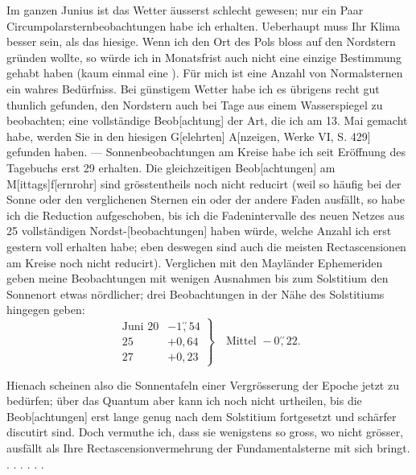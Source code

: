\noindent\hspace*{\parindent}Im ganzen Junius ist das Wetter äusserst schlecht gewesen; nur ein Paar Circumpolarsternbeobachtungen habe ich erhalten. Ueberhaupt muss Ihr Klima  besser sein, als das hiesige. Wenn ich den Ort des Pols bloss auf den Nordstern gründen wollte, so würde ich in Monatsfrist auch nicht eine einzige Bestimmung gehabt haben (kaum einmal eine ). Für mich ist eine Anzahl von Normalsternen ein wahres Bedürfniss. Bei günstigem Wetter habe ich es übrigens recht gut thunlich gefunden, den Nordstern auch bei Tage aus einem Wasserspiegel zu beobachten; eine vollständige Beob[achtung] der Art, die ich am 13. Mai gemacht habe, werden Sie in den hiesigen G[elehrten] A[nzeigen, Werke VI, S. 429] gefunden haben. — Sonnenbeobachtungen am Kreise habe ich seit Eröffnung des Tagebuchs erst 29 erhalten. Die gleichzeitigen Beob[achtungen] am M[ittags]f[ernrohr] sind grösstentheils noch nicht reducirt (weil so häufig bei der Sonne oder den verglichenen Sternen ein oder der andere Faden ausfällt, so habe ich die Reduction aufgeschoben, bis ich die Fadenintervalle des neuen Netzes aus 25 vollständigen Nordst-[beobachtungen] haben würde, welche Anzahl ich erst gestern voll erhalten habe; eben deswegen sind auch die meisten Rectascensionen am Kreise noch nicht reducirt). Verglichen mit den Mayländer Ephemeriden geben meine Beobachtungen mit wenigen Ausnahmen bis zum Solstitium den Sonnenort etwas nördlicher; drei Beobachtungen in der Nähe des Solstitiums hingegen geben:
\clearpage{}
\[
\left.\begin{array}{rr}\text{Juni }20&-1\overset{\prime\prime}{,}54\\25&+0{,}64\\27&+0{,}23\end{array}\right\}\quad\text{Mittel }-0\overset{\prime\prime}{,}22.
\]

\noindent\hspace*{\parindent}Hienach scheinen also die Sonnentafeln einer Vergrösserung der Epoche jetzt zu bedürfen; über das Quantum aber kann ich noch nicht urtheilen, bis die Beob[achtungen] erst lange genug nach dem Solstitium fortgesetzt und schärfer discutirt sind. Doch vermuthe ich, dass sie wenigstens so gross, wo nicht grösser, ausfällt als Ihre Rectascensionvermehrung der Fundamentalsterne mit sich bringt. . . . . . .
\clearpage\endgroup
